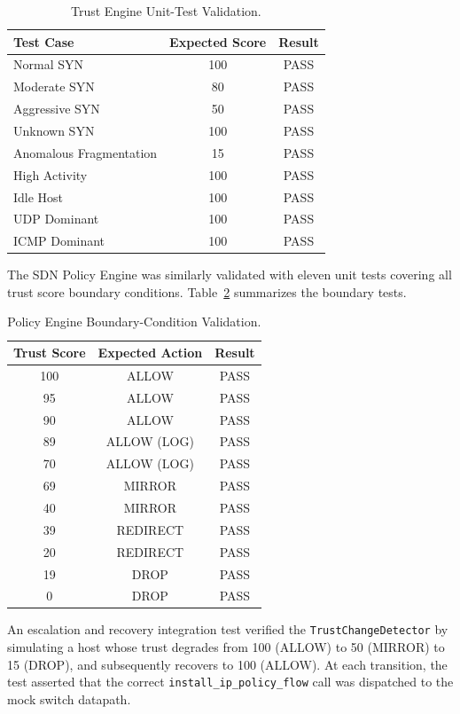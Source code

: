 \documentclass[conference]{IEEEtran}
\begin{document}
\begin{table}[h]
\centering
\caption{Trust Engine Unit-Test Validation.}
\label{tab:unitresults}
\begin{tabular}{lcc}
\toprule
Test Case & Expected Score & Result \\
\midrule
Normal SYN & 100 & PASS \\
Moderate SYN & 80 & PASS \\
Aggressive SYN & 50 & PASS \\
Unknown SYN & 100 & PASS \\
Anomalous Fragmentation & 15 & PASS \\
High Activity & 100 & PASS \\
Idle Host & 100 & PASS \\
UDP Dominant & 100 & PASS \\
ICMP Dominant & 100 & PASS \\
\bottomrule
\end{tabular}
\end{table}

The SDN Policy Engine was similarly validated with eleven unit tests covering all trust score boundary conditions. Table~\ref{tab:policyresults} summarizes the boundary tests.

\begin{table}[h]
\centering
\caption{Policy Engine Boundary-Condition Validation.}
\label{tab:policyresults}
\begin{tabular}{ccc}
\toprule
Trust Score & Expected Action & Result \\
\midrule
100 & ALLOW & PASS \\
95 & ALLOW & PASS \\
90 & ALLOW & PASS \\
89 & ALLOW (LOG) & PASS \\
70 & ALLOW (LOG) & PASS \\
69 & MIRROR & PASS \\
40 & MIRROR & PASS \\
39 & REDIRECT & PASS \\
20 & REDIRECT & PASS \\
19 & DROP & PASS \\
0 & DROP & PASS \\
\bottomrule
\end{tabular}
\end{table}

An escalation and recovery integration test verified the \texttt{TrustChangeDetector} by simulating a host whose trust degrades from 100 (ALLOW) to 50 (MIRROR) to 15 (DROP), and subsequently recovers to 100 (ALLOW). At each transition, the test asserted that the correct \texttt{install\_ip\_policy\_flow} call was dispatched to the mock switch datapath.
\end{document}
